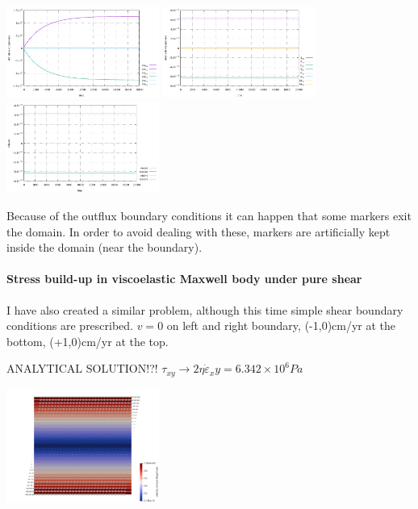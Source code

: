 \includegraphics[width=5cm]{python_codes/fieldstone_64/results/buildup_11/tau}
\includegraphics[width=5cm]{python_codes/fieldstone_64/results/buildup_11/strainrate}
\includegraphics[width=5cm]{python_codes/fieldstone_64/results/buildup_11/velocity}\\

\begin{remark}
Because of the outflux boundary conditions it can happen that some markers 
exit the domain. In order to avoid dealing with these, markers are artificially 
kept inside the domain (near the boundary).
\end{remark}

\paragraph{Stress build-up in viscoelastic Maxwell body under pure shear}

I have also created a similar problem, although this time simple shear boundary conditions are prescribed.
$v=0$ on left and right boundary, (-1,0)cm/yr at the bottom, (+1,0)cm/yr at the top.

ANALYTICAL SOLUTION!?!
$\tau_{xy} \rightarrow 2 \eta \dot{\varepsilon}_xy = 6.342\times 10^{6} Pa$ 

\begin{center}
\includegraphics[width=5cm]{python_codes/fieldstone_64/results/buildup_12/vel}
\end{center}


